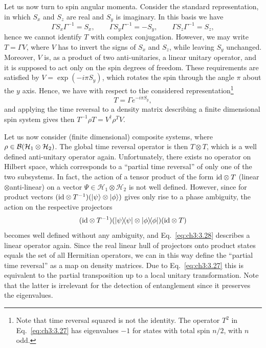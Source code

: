 \documentclass[11pt,a4paper]{article}
\numberwithin{equation}{section}
\begin{document}
Let us now turn to spin angular momenta. Consider the standard representation, in which $S_x$ and $S_z$ are real and
$S_y$ is imaginary. In this basis we have
\begin{equation}\label{eq:ch3:3.26}
    \Gamma S_x\Gamma^{-1}=S_x,
    \qquad
    \Gamma S_y\Gamma^{-1}=-S_y,
    \qquad
    \Gamma S_z\Gamma^{-1}=S_z,
\end{equation}
hence we cannot identify $T$ with complex conjugation. However, we may write $T=\Gamma V$, where $V$ has to invert the
signs of $S_x$ and $S_z$, while leaving $S_y$ unchanged. Moreover, $V$ is, as a product of two anti-unitaries, a linear
unitary operator, and it is supposed to act only on the spin degrees of freedom. These requirements are satisfied by
$V=\exp(-i\pi S_y)$, which rotates the spin through the angle $\pi$ about the $y$ axis. Hence, we have with respect to
the considered representation\footnote{Note that time reversal squared is not the identity. The operator $T^2$ in
    Eq.~\eqref{eq:ch3:3.27} has eigenvalues $-1$ for states with total spin $n/2$, with $n$ odd.}
\begin{equation}\label{eq:ch3:3.27}
    T=\Gamma e^{-i\pi S_y},
\end{equation}
and applying the time reversal to a density matrix describing a finite dimensional spin system gives then
$T^{-1}\rho T=V^\dagger \rho^T V$.

Let us now consider (finite dimensional) composite systems, where $\rho\in \mathcal{B}(\mathcal H_1\otimes \mathcal H_2)$.
The global time reversal operator is then $T\otimes T$, which is a well defined anti-unitary operator again.
Unfortunately, there exists no operator on Hilbert space, which corresponds to a ``partial time reversal'' of only one
of the two subsystems. In fact, the action of a tensor product of the form $\mathrm{id}\otimes T$ (linear$\otimes$anti-linear)
on a vector $\Psi\in \mathcal H_1\otimes \mathcal H_2$ is not well defined. However, since for product vectors
$(\mathrm{id}\otimes T^{-1})(|\psi\rangle\otimes |\phi\rangle)$ gives only rise to a phase ambiguity, the action on the respective
projectors
\begin{equation}\label{eq:ch3:3.28}
    (\mathrm{id}\otimes T^{-1})(|\psi\rangle\!\langle\psi|\otimes |\phi\rangle\!\langle\phi|)(\mathrm{id}\otimes T)
\end{equation}
becomes well defined without any ambiguity, and Eq.~\eqref{eq:ch3:3.28} describes a linear operator again. Since the
real linear hull of projectors onto product states equals the set of all Hermitian operators, we can in this way define
the ``partial time reversal'' as a map on density matrices. Due to Eq.~\eqref{eq:ch3:3.27} this is equivalent to the
partial transposition up to a local unitary transformation. Note that the latter is irrelevant for the detection of
entanglement since it preserves the eigenvalues.
\end{document}
